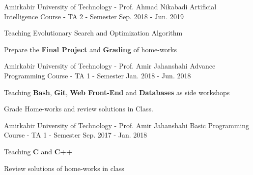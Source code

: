

\begin{cventries}

  \cventry
    {Amirkabir University of Technology - Prof. Ahmad Nikabadi} %
    {Artificial Intelligence Course - TA} %
    {2 - Semester} %
    {Sep. 2018 - Jun. 2019} %
    {
      \begin{cvitems} %
        \item {Teaching Evolutionary Search and Optimization Algorithm}
        \item {Prepare the \textbf{Final Project} and \textbf{Grading} of home-works}
      \end{cvitems}
    }
    
    
\cventry
{Amirkabir University of Technology - Prof. Amir Jahanshahi} %
{Advance Programming Course - TA} %
{1 - Semester} %
{Jan. 2018 - Jun. 2018} %
{
  \begin{cvitems} %
    \item {Teaching \textbf{Bash}, \textbf{Git}, \textbf{Web Front-End} and \textbf{Databases} as side workshops}
    \item {Grade Home-works and review solutions in Class.}
  \end{cvitems}
}


\cventry
{Amirkabir University of Technology - Prof. Amir Jahanshahi} %
{Basic Programming Course - TA} %
{1 - Semester} %
{Sep. 2017 - Jan. 2018} %
{
  \begin{cvitems} %
    \item {Teaching \textbf{C} and \textbf{C++}}
    \item {Review solutions of home-works in class}
  \end{cvitems}
}



\end{cventries}
